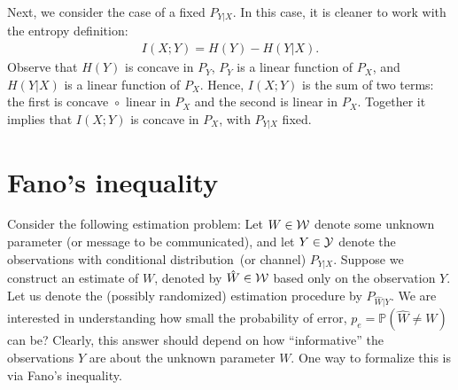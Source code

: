 \documentclass[12pt]{article}
\begin{document}
Next, we consider the case of a fixed $P_{Y|X}$. In this case, it is cleaner to work with the entropy definition: 
\begin{align}
I(X;Y) = H(Y) - H(Y|X). 
\end{align}
Observe that $H(Y)$ is concave in $P_Y$,  $P_Y$ is a linear function of $P_X$, and $H(Y|X)$ is a linear function of $P_X$. Hence, $I(X;Y)$ is the sum of two terms: the first is concave~$\circ$~linear in $P_X$ and the second is linear in $P_X$. Together it implies that $I(X;Y)$ is concave in $P_X$, with $P_{Y|X}$ fixed. 

\section{Fano's inequality}

Consider the following estimation problem: Let $W \in {\cal W}$ denote some unknown parameter (or message to be communicated), and let $Y \in {\cal Y}$ denote  the observations with conditional distribution~(or channel) $P_{Y|X}$. Suppose we construct an estimate of $W$, denoted by $\hat{W} \in {\cal W}$ based only on the observation $Y$. Let us denote the (possibly randomized) estimation procedure by $P_{\hat{W}|Y}$. We are interested in understanding how small the probability of error, $p_e = \mathbb{P}(\hat{W} \neq W)$ can be? Clearly, this answer should depend on how ``informative'' the observations $Y$ are about the unknown parameter $W$. One way to formalize this is via Fano's inequality. 
\end{document}
